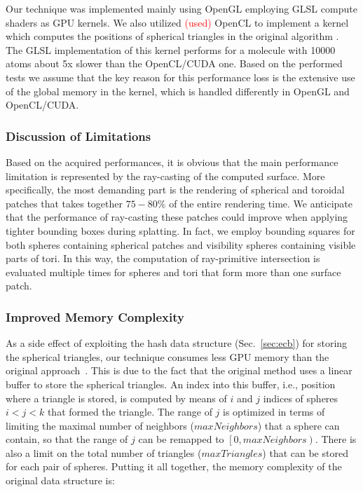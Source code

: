Our technique was implemented mainly using OpenGL employing GLSL compute shaders as GPU kernels.
We also utilized \textcolor{red}{(used)} OpenCL to implement a kernel which computes the positions of spherical triangles in the original algorithm \cite{krone2011parallel}.
The GLSL implementation of this kernel performs for a molecule with {\tweakedsim}10000 atoms about 5x slower than the OpenCL/CUDA one.
Based on the performed tests we assume that the key reason for this performance loss is the extensive use of the global memory in the kernel, which is handled differently in OpenGL and OpenCL/CUDA.

\subsubsection{Discussion of Limitations}
Based on the acquired performances, it is obvious that the main performance limitation is represented by the ray-casting of the computed surface.
More specifically, the most demanding part is the rendering of spherical and toroidal patches that takes together $75-80\%$ of the entire rendering time.
We anticipate that the performance of ray-casting these patches could improve when applying tighter bounding boxes during splatting.
In fact, we employ bounding squares for both spheres containing spherical patches and visibility spheres containing visible parts of tori.
In this way, the computation of ray-primitive intersection is evaluated multiple times for spheres and tori that form more than one surface patch.

\subsubsection{Improved Memory Complexity}

As a side effect of exploiting the hash data structure (Sec.~\ref{sec:ecb}) for storing the spherical triangles, our technique consumes less GPU memory than the original approach~\cite{krone2011parallel}.
This is due to the fact that the original method uses a linear buffer to store the spherical triangles.
An index into this buffer, i.e., position where a triangle is stored, is computed by means of $i$ and $j$ indices of spheres $i < j < k$ that formed the triangle.
The range of $j$ is optimized in terms of limiting the maximal number of neighbors ($maxNeighbors$) that a sphere can contain, so that the range of $j$ can be remapped to $\left[0, maxNeighbors\right)$.
There is also a limit on the total number of triangles ($maxTriangles$) that can be stored for each pair of spheres.
Putting it all together, the memory complexity of the original data structure is:

